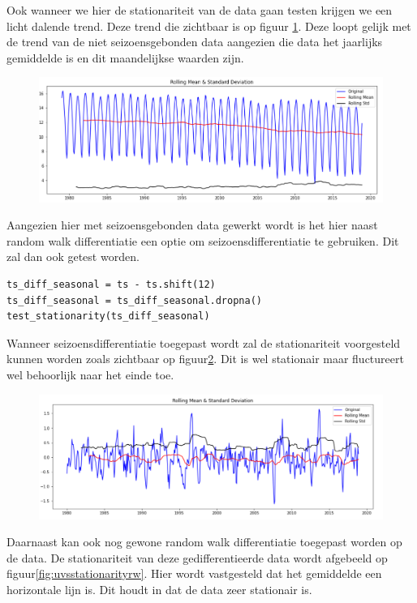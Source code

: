 Ook wanneer we hier de stationariteit van de data gaan testen krijgen we een licht dalende trend. Deze trend die zichtbaar is op figuur \ref{fig:uvsstationarity}. Deze loopt gelijk met de trend van de niet seizoensgebonden data aangezien die data het jaarlijks gemiddelde is en dit maandelijkse waarden zijn.

\begin{figure}
    \centering
    \caption{}
    \label{fig:uvsstationarity}
    \includegraphics[width=0.7\linewidth]{uvsstationarity}
\end{figure}

Aangezien hier met seizoensgebonden data gewerkt wordt is het hier naast random walk differentiatie een optie om seizoensdifferentiatie te gebruiken. Dit zal dan ook getest worden. 

\begin{verbatim}
ts_diff_seasonal = ts - ts.shift(12)
ts_diff_seasonal = ts_diff_seasonal.dropna()
test_stationarity(ts_diff_seasonal)
\end{verbatim}

Wanneer seizoensdifferentiatie toegepast wordt zal de stationariteit voorgesteld kunnen worden zoals zichtbaar op figuur\ref{fig:uvsstationarityseasonal}. Dit is wel stationair maar fluctureert wel behoorlijk naar het einde toe.

\begin{figure}
    \centering
    \caption{}
    \label{fig:uvsstationarityseasonal}
    \includegraphics[width=0.7\linewidth]{uvsstationarityseasonal}
\end{figure}

Daarnaast kan ook nog gewone random walk differentiatie toegepast worden op de data. De stationariteit van deze gedifferentieerde data wordt afgebeeld op figuur\ref{fig:uvsstationarityrw}. Hier wordt vastgesteld dat het gemiddelde een horizontale lijn is. Dit houdt in dat de data zeer stationair is.


